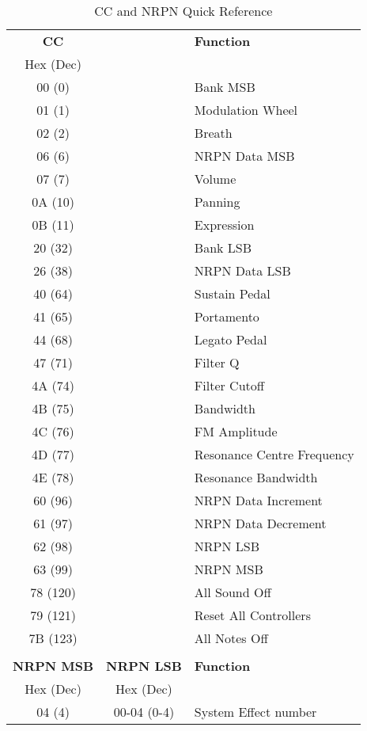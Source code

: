       \begin{table}[H]
      \centering
      \caption{CC and NRPN Quick Reference}
      \label{table:CCandNRPNreference}
      \begin{tabular}{c c l}
    \textbf{CC} & & \textbf{Function} \\
       Hex (Dec) \\
       00 (0) & & Bank MSB\\
       01 (1) & & Modulation Wheel\\
       02 (2) & & Breath\\
       06 (6) & & NRPN Data MSB\\
       07 (7) & & Volume\\
       0A (10) & & Panning\\
       0B (11) & & Expression\\
       20 (32) & & Bank LSB\\
       26 (38) & & NRPN Data LSB \\
       40 (64) & & Sustain Pedal \\
       41 (65) & & Portamento \\
       44 (68) & & Legato Pedal \\
       47 (71) & & Filter Q \\
       4A (74) & & Filter Cutoff \\
       4B (75) & & Bandwidth \\
       4C (76) & & FM Amplitude \\
       4D (77) & & Resonance Centre Frequency\\
       4E (78) & & Resonance Bandwidth \\
       60 (96) & & NRPN Data Increment \\
       61 (97) & & NRPN Data Decrement \\
       62 (98) & & NRPN LSB \\
       63 (99) & & NRPN MSB \\
       78 (120) & & All Sound Off \\
       79 (121) & & Reset All Controllers \\
       7B (123) & & All Notes Off\\
       \\
    \textbf{NRPN MSB} & \textbf{NRPN LSB} & \textbf{Function} \\
        Hex (Dec) & Hex (Dec)\\
        04 (4) & 00-04 (0-4)& System Effect number \\

\end{tabular}
\end{table}

